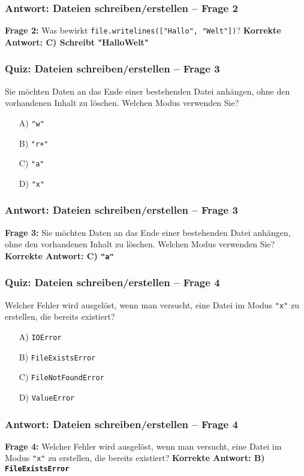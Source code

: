 \documentclass[aspectratio=169]{beamer} %
\begin{document}
\begin{frame}[fragile]
\frametitle{Antwort: Dateien schreiben/erstellen – Frage 2}
\textbf{Frage 2:} Was bewirkt \texttt{file.writelines(["Hallo", "Welt"])}?
\vspace{1em}
\textbf{Korrekte Antwort: C) Schreibt "HalloWelt"}
\end{frame}

\begin{frame}[fragile]
\frametitle{Quiz: Dateien schreiben/erstellen – Frage 3}
Sie möchten Daten an das Ende einer bestehenden Datei anhängen, ohne den vorhandenen Inhalt zu löschen. Welchen Modus verwenden Sie?
\begin{enumerate}
    \item[A)] \texttt{"w"}
    \item[B)] \texttt{"r+"}
    \item[C)] \texttt{"a"}
    \item[D)] \texttt{"x"}
\end{enumerate}
\end{frame}

\begin{frame}[fragile]
\frametitle{Antwort: Dateien schreiben/erstellen – Frage 3}
\textbf{Frage 3:} Sie möchten Daten an das Ende einer bestehenden Datei anhängen, ohne den vorhandenen Inhalt zu löschen. Welchen Modus verwenden Sie?
\vspace{1em}
\textbf{Korrekte Antwort: C) \texttt{"a"}}
\end{frame}

\begin{frame}[fragile]
\frametitle{Quiz: Dateien schreiben/erstellen – Frage 4}
Welcher Fehler wird ausgelöst, wenn man versucht, eine Datei im Modus \texttt{"x"} zu erstellen, die bereits existiert?
\begin{enumerate}
    \item[A)] \texttt{IOError}
    \item[B)] \texttt{FileExistsError}
    \item[C)] \texttt{FileNotFoundError}
    \item[D)] \texttt{ValueError}
\end{enumerate}
\end{frame}

\begin{frame}[fragile]
\frametitle{Antwort: Dateien schreiben/erstellen – Frage 4}
\textbf{Frage 4:} Welcher Fehler wird ausgelöst, wenn man versucht, eine Datei im Modus \texttt{"x"} zu erstellen, die bereits existiert?
\vspace{1em}
\textbf{Korrekte Antwort: B) \texttt{FileExistsError}}
\end{frame}
\end{document}

